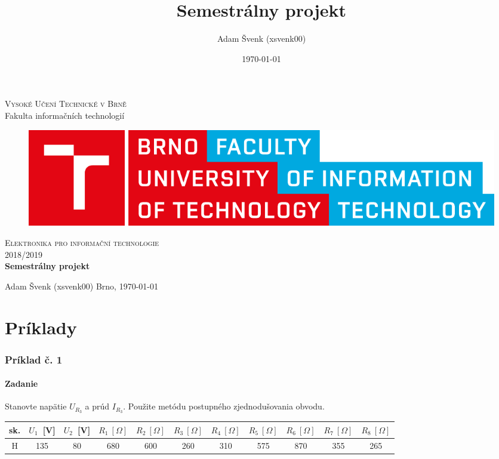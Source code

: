 \documentclass{article}
\title{\huge Semestrálny projekt}
\author{Adam Švenk (xsvenk00)}
\date{\today}
\begin{document}
\begin{titlepage}
	\begin{center}
		\textsc{\huge Vysoké Učení Technické v Brně} \\[0.5cm]
		{\LARGE Fakulta informačních technologií}
				
		\begin{figure}[H]
			\center\includegraphics[width=0.5\linewidth]{logo.pdf}
		\end{figure}
				
		\vspace{3cm}
				
		\textsc{\LARGE Elektronika pro informační technologie} \\[0.5cm]
		\textsc{\LARGE 2018/2019} \\[3.5cm]
				
		\textbf{{\LARGE Semestrálny projekt}}
	\end{center}
	\vfill
	\begin{flushleft} 
		\large
		Adam Švenk (xsvenk00)
		\hfill
		Brno, \today
	\end{flushleft}
\end{titlepage}

\part{Príklady}

\section{Príklad č. 1}
\subsection{Zadanie}
Stanovte napätie $U_{R_{3}}$ a prúd $I_{R_{3}}$.
Použite metódu postupného zjednodušovania obvodu. \\
\begin{table}[ht]
	\centering
	\begin{tabular}{|c|c|c|c|c|c|c|c|c|c|c|}
		\hline
		sk. & $U_{1}$~[V] & $U_{2}$~[V] & $R_{1}~[\Omega]$ & $R_{2}~[\Omega]$ & $R_{3}~[\Omega]$ & $R_{4}~[\Omega]$ & $R_{5}~[\Omega]$ & $R_{6}~[\Omega]$ & $R_{7}~[\Omega]$ & $R_{8}~[\Omega]$ \\
		\hline
		H   & 135         & 80          & 680              & 600              & 260              & 310              & 575              & 870              & 355              & 265              \\
		\hline
	\end{tabular}
\end{table}
\end{document}
